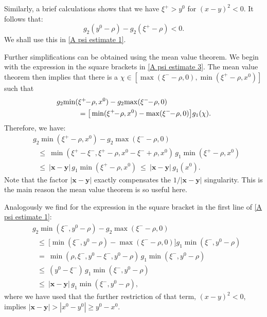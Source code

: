 \documentclass[b5paper,draft,openbib,12pt]{memoir}
\newcommand{\vx}{\mathbf{x}}
\newcommand{\vy}{\mathbf{y}}
\begin{document}
Similarly, a brief calculations shows that we have 
$\xi^+ > y^0$ for $(x-y)^2<0$. It follows that:
\begin{equation}
	g_2(y^0-\rho) - g_2(\xi^+ - \rho) < 0.
\end{equation}
We shall use this in \eqref{A psi estimate 1}.

Further simplifications can be obtained using the mean 
value theorem. We begin with the expression in the 
square brackets in \eqref{A psi estimate 3}. The mean 
value theorem then implies that there is a 
\(\chi\in[\max(\xi^-\!\!-\!\rho,0),\min(\xi^+\!\!-\!\rho,x^0)]\) 
such that
\begin{align}\notag
    g_2\!\min(&\xi^+\!\!-\!\rho,x^0)-g_2\!\max(\xi^-\!\!-\!\rho,0)\\
    &= \big[\min(\xi^+\!\!-\!\rho,x^0)-\max(\xi^-\!\!-\!\rho,0)\big]g_1(\chi).
\end{align}
Therefore, we have:
\begin{align}
   & g_2\!\min(\xi^+\!\!-\!\rho,x^0)-g_2\!\max(\xi^-\!\!-\!\rho,0)\nonumber\\
   &~~~\le~ \min(\xi^+\!\!-\xi^-,\xi^+\!\!-\!\rho,x^0-\xi^-+\rho,x^0)\, g_1\!\min(\xi^+\!\!-\!\rho,x^0)\nonumber\\
   & ~~~\le~ |\vx-\vy|\, g_1\!\min(\xi^+\!\!-\!\rho,x^0) ~\le~ |\vx-\vy| \,g_1(x^0).
\end{align}
Note that the factor $|\vx-\vy|$ exactly compensates the $1/|\vx-\vy|$ 
singularity. 
This is the main reason the mean value theorem is so useful here.

Analogously we find for the expression in the square bracket in the first 
line of \eqref{A psi estimate 1}:
\begin{align}
    &g_2\!\min(\xi^-,y^0-\!\rho)-g_2\!\max(\xi^-\!\!-\!\rho,0)\nonumber\\
&~~~\leq ~ \big[\min(\xi^-,y^0-\!\rho)-\max(\xi^-\!\!-\!\rho,0)\big] g_1\!\min(\xi^-,y^0-\!\rho)\nonumber\\
    &~~~=~\min(\rho,\xi^-,y^0-\xi^-,y^0-\!\rho) \, g_1\!\min(\xi^-,y^0-\!\rho)\nonumber\\
    &~~~\le~ (y^0-\xi^-) \,g_1\!\min(\xi^-,y^0-\!\rho)\nonumber\\
    &~~~\le~ |\vx-\vy| \,g_1\!\min(\xi^-,y^0-\!\rho),
\end{align}
where we have used that the further restriction of that term, $(x-y)^2<0$, 
implies $|\vx-\vy|>|x^0-y^0|\geq y^0-x^0$.
\end{document}
